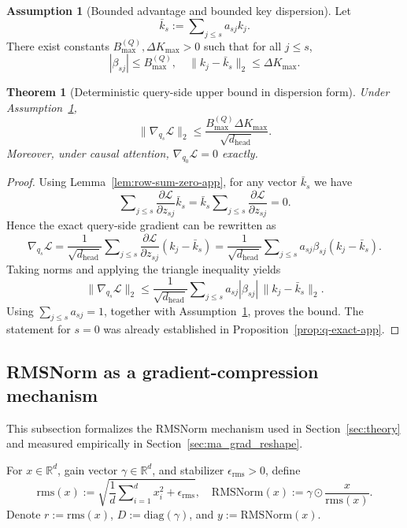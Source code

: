 \documentclass{article}
\theoremstyle{plain}
\newtheorem{theorem}{Theorem}
\theoremstyle{definition}
\newtheorem{assumption}{Assumption}
\theoremstyle{remark}
\begin{document}
\begin{assumption}[Bounded advantage and bounded key dispersion]\label{assump:q-bounded-app}
Let
\[
    \bar{k}_s := \sum\nolimits_{j \le s} a_{sj} k_j.
\]
There exist constants $B_{\max}^{(Q)}, \Delta K_{\max} > 0$ such that for all $j \le s$,
\[
    |\beta_{sj}| \le B_{\max}^{(Q)},
    \quad
    \|k_j - \bar{k}_s\|_2 \le \Delta K_{\max}.
\]
\end{assumption}

\begin{theorem}[Deterministic query-side upper bound in dispersion form]\label{thm:q-bound-app}
Under Assumption~\ref{assump:q-bounded-app},
\[
    \|\nabla_{q_s} \mathcal{L}\|_2 \le \frac{B_{\max}^{(Q)} \Delta K_{\max}}{\sqrt{d_{\mathrm{head}}}}.
\]
Moreover, under causal attention, $\nabla_{q_0}\mathcal{L} = 0$ exactly.
\end{theorem}

\begin{proof}
Using Lemma~\ref{lem:row-sum-zero-app}, for any vector $\bar{k}_s$ we have
\[
    \sum\nolimits_{j \le s} \frac{\partial \mathcal{L}}{\partial z_{sj}}\bar{k}_s = \bar{k}_s \sum\nolimits_{j \le s} \frac{\partial \mathcal{L}}{\partial z_{sj}} = 0.
\]
Hence the exact query-side gradient can be rewritten as
\[
    \nabla_{q_s} \mathcal{L}
    = \frac{1}{\sqrt{d_{\mathrm{head}}}} \sum\nolimits_{j \le s} \frac{\partial \mathcal{L}}{\partial z_{sj}} (k_j - \bar{k}_s)
    = \frac{1}{\sqrt{d_{\mathrm{head}}}} \sum\nolimits_{j \le s} a_{sj}\beta_{sj}(k_j - \bar{k}_s).
\]
Taking norms and applying the triangle inequality yields
\[
    \|\nabla_{q_s} \mathcal{L}\|_2
    \le \frac{1}{\sqrt{d_{\mathrm{head}}}} \sum\nolimits_{j \le s} a_{sj}|\beta_{sj}|\,\|k_j - \bar{k}_s\|_2.
\]
Using $\sum\nolimits_{j \le s} a_{sj}=1$, together with Assumption~\ref{assump:q-bounded-app}, proves the bound.
The statement for $s=0$ was already established in Proposition~\ref{prop:q-exact-app}.
\end{proof}

\subsection{RMSNorm as a gradient-compression mechanism}\label{app:theory:rmsnorm}

This subsection formalizes the RMSNorm mechanism used in Section~\ref{sec:theory} and measured empirically in Section~\ref{sec:ma_grad_reshape}.

For $x \in \mathbb{R}^d$, gain vector $\gamma \in \mathbb{R}^d$, and stabilizer $\epsilon_{\mathrm{rms}}>0$, define
\[
    \mathrm{rms}(x) := \sqrt{\frac{1}{d}\sum\nolimits_{i=1}^d x_i^2+\epsilon_{\mathrm{rms}}},
    \quad
    \mathrm{RMSNorm}(x) := \gamma \odot \frac{x}{\mathrm{rms}(x)}.
\]
Denote $r := \mathrm{rms}(x)$, $D := \mathrm{diag}(\gamma)$, and $y := \mathrm{RMSNorm}(x)$.
\end{document}
